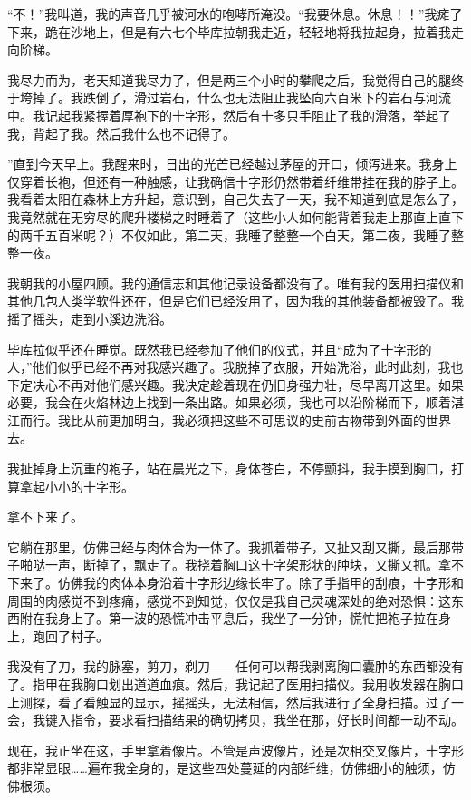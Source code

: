 \documentclass[AutoFakeBold=true]{book}
\begin{document}
``不！''我叫道，我的声音几乎被河水的咆哮所淹没。``我要休息。休息！！''我瘫了下来，跪在沙地上，但是有六七个毕库拉朝我走近，轻轻地将我拉起身，拉着我走向阶梯。

我尽力而为，老天知道我尽力了，但是两三个小时的攀爬之后，我觉得自己的腿终于垮掉了。我跌倒了，滑过岩石，什么也无法阻止我坠向六百米下的岩石与河流中。我记起我紧握着厚袍下的十字形，然后有十多只手阻止了我的滑落，举起了我，背起了我。然后我什么也不记得了。

''直到今天早上。我醒来时，日出的光芒已经越过茅屋的开口，倾泻进来。我身上仅穿着长袍，但还有一种触感，让我确信十字形仍然带着纤维带挂在我的脖子上。我看着太阳在森林上方升起，意识到，自己失去了一天，我不知道到底是怎么了，我竟然就在无穷尽的爬升楼梯之时睡着了（这些小人如何能背着我走上那直上直下的两千五百米呢？）不仅如此，第二天，我睡了整整一个白天，第二夜，我睡了整整一夜。

我朝我的小屋四顾。我的通信志和其他记录设备都没有了。唯有我的医用扫描仪和其他几包人类学软件还在，但是它们已经没用了，因为我的其他装备都被毁了。我摇了摇头，走到小溪边洗浴。

毕库拉似乎还在睡觉。既然我已经参加了他们的仪式，并且``成为了十字形的人，''他们似乎已经不再对我感兴趣了。我脱掉了衣服，开始洗浴，此时此刻，我也下定决心不再对他们感兴趣。我决定趁着现在仍旧身强力壮，尽早离开这里。如果必要，我会在火焰林边上找到一条出路。如果必须，我也可以沿阶梯而下，顺着湛江而行。我比从前更加明白，我必须把这些不可思议的史前古物带到外面的世界去。

我扯掉身上沉重的袍子，站在晨光之下，身体苍白，不停颤抖，我手摸到胸口，打算拿起小小的十字形。

拿不下来了。

它躺在那里，仿佛已经与肉体合为一体了。我抓着带子，又扯又刮又撕，最后那带子啪哒一声，断掉了，飘走了。我挠着胸口这十字架形状的肿块，又撕又抓。拿不下来了。仿佛我的肉体本身沿着十字形边缘长牢了。除了手指甲的刮痕，十字形和周围的肉感觉不到疼痛，感觉不到知觉，仅仅是我自己灵魂深处的绝对恐惧：这东西附在我身上了。第一波的恐慌冲击平息后，我坐了一分钟，慌忙把袍子拉在身上，跑回了村子。

我没有了刀，我的脉塞，剪刀，剃刀——任何可以帮我剥离胸口囊肿的东西都没有了。指甲在我胸口划出道道血痕。然后，我记起了医用扫描仪。我用收发器在胸口上测探，看了看触显的显示，摇摇头，无法相信，然后我进行了全身扫描。过了一会，我键入指令，要求看扫描结果的确切拷贝，我坐在那，好长时间都一动不动。

现在，我正坐在这，手里拿着像片。不管是声波像片，还是次相交叉像片，十字形都非常显眼……遍布我全身的，是这些四处蔓延的内部纤维，仿佛细小的触须，仿佛根须。
\end{document}
